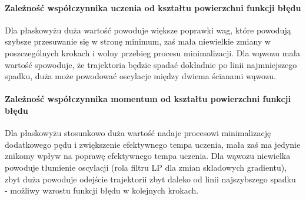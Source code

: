 \paragraph{Zależność współczynnika uczenia od kształtu powierzchni funkcji błędu}

Dla płaskowyżu duża wartość powoduje większe poprawki wag, które powodują szybsze przesuwanie się
w stronę minimum, zaś mała niewielkie zmiany w poszczególnych krokach i wolny przebieg procesu minimalizacji.
Dla wąwozu mała wartość spowoduje, że trajektoria będzie spadać dokładnie po linii najmniejszego spadku, 
duża może powodować oscylacje między dwiema ścianami wąwozu.

\paragraph{Zależność współczynnika momentum od kształtu powierzchni funkcji błędu}

Dla płaskowyżu stosunkowo duża wartość nadaje procesowi minimalizację dodatkowego pędu i zwiększenie
efektywnego tempa uczenia, mała zaś ma jedynie znikomy wpływ na poprawę efektywnego tempa uczenia.
Dla wąwozu niewielka powoduje tłumienie oscylacji (rola filtru LP dla zmian składowych gradientu), zbyt duża
powoduje odejście trajektorii zbyt daleko od linii najszybszego spadku - możliwy wzrostu funkcji błędu w kolejnych krokach.